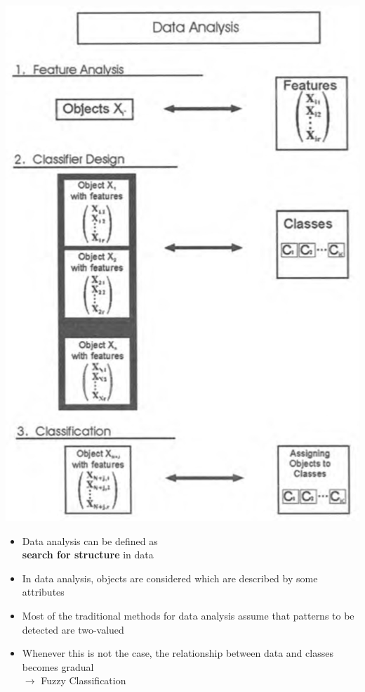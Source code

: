 \documentclass[a4paper]{article}
\begin{document}
			\begin{minipage}[c]{0.3\textwidth}
				\centering
				\includegraphics[width=.8\textwidth]{img/sw01/fda.png}
			\end{minipage}
			\hfill
			\begin{minipage}[c]{0.6\textwidth}
				\begin{itemize}
					\item Data analysis can be defined as  \\
						\textbf{search for structure} in data
					\item In data analysis, objects are considered which are described by some attributes
					\item Most of the traditional methods for data analysis assume that patterns to be detected are two-valued
					\item Whenever this is not the case, the relationship between data and classes becomes gradual \\
						$\rightarrow$ Fuzzy Classification
				\end{itemize}
			\end{minipage}
			
			\newpage
			
\end{document}

